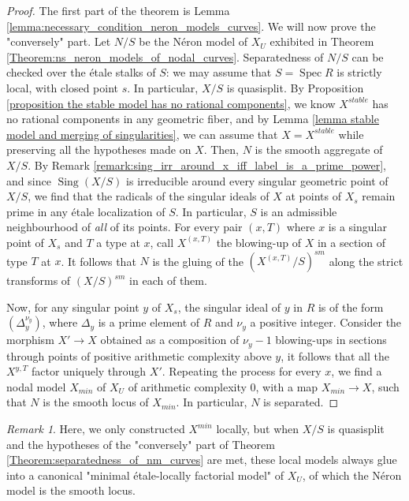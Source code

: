 \documentclass[a4paper,10pt,twoside]{article}
\DeclareMathOperator{\spec}{Spec}
\DeclareMathOperator{\sing}{Sing}
\theoremstyle{definition}
\theoremstyle{remark}
\newtheorem{rem}{Remark}[thm]
\begin{document}
\begin{proof}
The first part of the theorem is Lemma \ref{lemma:necessary_condition_neron_models_curves}. We will now prove the "conversely" part. Let $N/S$ be the N\'eron model of $X_U$ exhibited in Theorem \ref{Theorem:ns_neron_models_of_nodal_curves}. Separatedness of $N/S$ can be checked over the \'etale stalks of $S$: we may assume that $S=\spec R$ is strictly local, with closed point $s$. In particular, $X/S$ is quasisplit. By Proposition \ref{proposition the stable model has no rational components}, we know $X^{stable}$ has no rational components in any geometric fiber, and by Lemma \ref{lemma stable model and merging of singularities}, we can assume that $X=X^{stable}$ while preserving all the hypotheses made on $X$. Then, $N$ is the smooth aggregate of $X/S$. By Remark \ref{remark:sing_irr_around_x_iff_label_is_a_prime_power}, and since $\sing(X/S)$ is irreducible around every singular geometric point of $X/S$, we find that the radicals of the singular ideals of $X$ at points of $X_s$ remain prime in any étale localization of $S$. In particular, $S$ is an admissible neighbourhood of \emph{all} of its points. For every pair $(x,T)$ where $x$ is a singular point of $X_s$ and $T$ a type at $x$, call $X^{(x,T)}$ the blowing-up of $X$ in a section of type $T$ at $x$. It follows that $N$ is the gluing of the $(X^{(x,T)}/S)^{sm}$ along the strict transforms of $(X/S)^{sm}$ in each of them.

Now, for any singular point $y$ of $X_s$, the singular ideal of $y$ in $R$ is of the form $(\Delta_y^{\nu_y})$, where $\Delta_y$ is a prime element of $R$ and $\nu_y$ a positive integer. Consider the morphism $X'\to X$ obtained as a composition of $\nu_y-1$ blowing-ups in sections through points of positive arithmetic complexity above $y$, it follows that all the $X^{y,T}$ factor uniquely through $X'$. Repeating the process for every $x$, we find a nodal model $X_{min}$ of $X_U$ of arithmetic complexity $0$, with a map $X_{min}\to X$, such that $N$ is the smooth locus of $X_{min}$. In particular, $N$ is separated.
\end{proof}

\begin{rem}
Here, we only constructed $X^{min}$ locally, but when $X/S$ is quasisplit and the hypotheses of the "conversely" part of Theorem \ref{Theorem:separatedness_of_nm_curves} are met, these local models always glue into a canonical "minimal \'etale-locally factorial model" of $X_U$, of which the N\'eron model is the smooth locus.
\end{rem}


\end{document}
